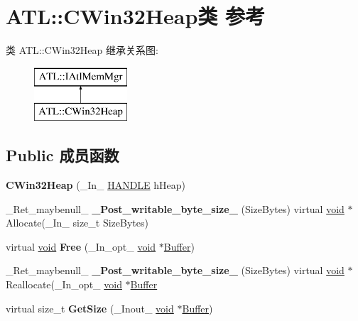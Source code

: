 \hypertarget{class_a_t_l_1_1_c_win32_heap}{}\section{A\+TL\+:\+:C\+Win32\+Heap类 参考}
\label{class_a_t_l_1_1_c_win32_heap}
类 A\+TL\+:\+:C\+Win32\+Heap 继承关系图\+:\begin{figure}[H]
\begin{center}
\leavevmode
\includegraphics[height=2.000000cm]{class_a_t_l_1_1_c_win32_heap}
\end{center}
\end{figure}
\subsection*{Public 成员函数}
\begin{DoxyCompactItemize}
\item 
\mbox{\label{class_a_t_l_1_1_c_win32_heap_a95a37bdf7e525c9b04e798d2b98e4f71}} 
{\bfseries C\+Win32\+Heap} (\+\_\+\+In\+\_\+ \hyperlink{interfacevoid}{H\+A\+N\+D\+LE} h\+Heap)
\item 
\mbox{\label{class_a_t_l_1_1_c_win32_heap_a67e8022f2eebb8dffe6654a2fed95813}} 
\+\_\+\+Ret\+\_\+maybenull\+\_\+ {\bfseries \+\_\+\+Post\+\_\+writable\+\_\+byte\+\_\+size\+\_\+} (Size\+Bytes) virtual \hyperlink{interfacevoid}{void} $\ast$Allocate(\+\_\+\+In\+\_\+ size\+\_\+t Size\+Bytes)
\item 
\mbox{\label{class_a_t_l_1_1_c_win32_heap_a6ec4fe157c56b5dab308b0658d556dba}} 
virtual \hyperlink{interfacevoid}{void} {\bfseries Free} (\+\_\+\+In\+\_\+opt\+\_\+ \hyperlink{interfacevoid}{void} $\ast$\hyperlink{class_buffer}{Buffer})
\item 
\mbox{\label{class_a_t_l_1_1_c_win32_heap_a57fae9d7985dd216acbd6aeba72b4e9a}} 
\+\_\+\+Ret\+\_\+maybenull\+\_\+ {\bfseries \+\_\+\+Post\+\_\+writable\+\_\+byte\+\_\+size\+\_\+} (Size\+Bytes) virtual \hyperlink{interfacevoid}{void} $\ast$Reallocate(\+\_\+\+In\+\_\+opt\+\_\+ \hyperlink{interfacevoid}{void} $\ast$\hyperlink{class_buffer}{Buffer}
\item 
\mbox{\label{class_a_t_l_1_1_c_win32_heap_ad553d7755d8bbb6192f3d085df7f5a5e}} 
virtual size\+\_\+t {\bfseries Get\+Size} (\+\_\+\+Inout\+\_\+ \hyperlink{interfacevoid}{void} $\ast$\hyperlink{class_buffer}{Buffer})
\end{DoxyCompactItemize}
